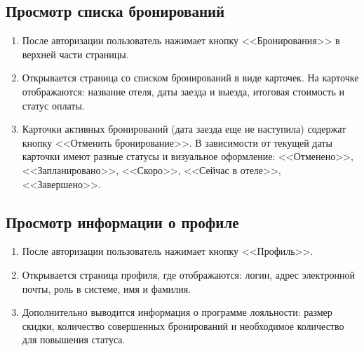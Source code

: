 \subsection{Просмотр списка бронирований}
\begin{enumerate}
	\item После авторизации пользователь нажимает кнопку <<Бронирования>> в верхней части страницы.
	\item Открывается страница со списком бронирований в виде карточек.  
	На карточке отображаются: название отеля, даты заезда и выезда, итоговая стоимость и статус оплаты.
	\item Карточки активных бронирований (дата заезда еще не наступила) содержат кнопку <<Отменить бронирование>>.  
	В зависимости от текущей даты карточки имеют разные статусы и визуальное оформление: <<Отменено>>, <<Запланировано>>, <<Скоро>>, <<Сейчас в отеле>>, <<Завершено>>.
\end{enumerate}

\subsection{Просмотр информации о профиле}
\begin{enumerate}
	\item После авторизации пользователь нажимает кнопку <<Профиль>>.
	\item Открывается страница профиля, где отображаются: логин, адрес электронной почты, роль в системе, имя и фамилия.
	\item Дополнительно выводится информация о программе лояльности: размер скидки, количество совершенных бронирований и необходимое количество для повышения статуса.
\end{enumerate}
